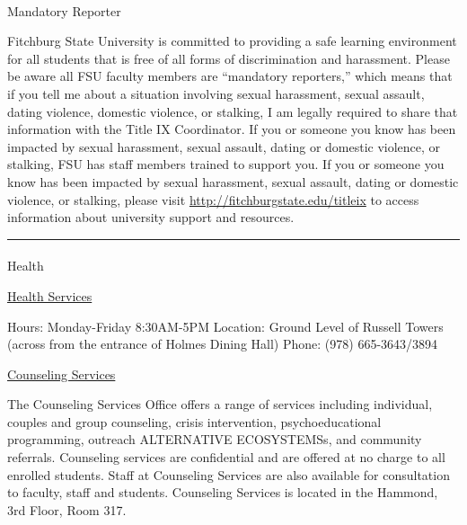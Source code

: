 \documentclass[
  letterpaper,
  DIV=11,
  numbers=noendperiod,
  oneside]{scrartcl}
\makeatletter
\let\oldparagraph\paragraph
\renewcommand{\paragraph}{
    \@ifstar
      \xxxParagraphStar
      \xxxParagraphNoStar
  }
\newcommand{\xxxParagraphStar}[1]{\oldparagraph*{#1}\mbox{}}
\newcommand{\xxxParagraphNoStar}[1]{\oldparagraph{#1}\mbox{}}
\makeatother
\begin{document}
\paragraph{Mandatory Reporter}\label{mandatory-reporter}

Fitchburg State University is committed to providing a safe learning
environment for all students that is free of all forms of discrimination
and harassment. Please be aware all FSU faculty members are ``mandatory
reporters,'' which means that if you tell me about a situation involving
sexual harassment, sexual assault, dating violence, domestic violence,
or stalking, I am legally required to share that information with the
Title IX Coordinator. If you or someone you know has been impacted by
sexual harassment, sexual assault, dating or domestic violence, or
stalking, FSU has staff members trained to support you. If you or
someone you know has been impacted by sexual harassment, sexual assault,
dating or domestic violence, or stalking, please visit
\url{http://fitchburgstate.edu/titleix} to access information about
university support and resources.

\begin{center}\rule{0.5\linewidth}{0.5pt}\end{center}

\paragraph{Health}\label{health}

\href{http://www.google.com/url?q=http\%3A\%2F\%2Fwww.fitchburgstate.edu\%2Foffices-services-directory\%2Fhealth-services\%2F&sa=D&sntz=1&usg=AFQjCNEw5V0i0hL5DVO5b43gejNNaAt4ig}{Health
Services}

Hours: Monday-Friday 8:30AM-5PM Location: Ground Level of Russell Towers
(across from the entrance of Holmes Dining Hall) Phone: (978)
665-3643/3894

\href{http://www.google.com/url?q=http\%3A\%2F\%2Fwww.fitchburgstate.edu\%2Foffices-services-directory\%2Fcounseling-services\%2F&sa=D&sntz=1&usg=AFQjCNEYiS4EmSvWerpp2bKr5lTpouPuqQ}{Counseling
Services}

The Counseling Services Office offers a range of services including
individual, couples and group counseling, crisis intervention,
psychoeducational programming, outreach ALTERNATIVE ECOSYSTEMSs, and
community referrals. Counseling services are confidential and are
offered at no charge to all enrolled students. Staff at Counseling
Services are also available for consultation to faculty, staff and
students. Counseling Services is located in the Hammond, 3rd Floor, Room
317.
\end{document}
